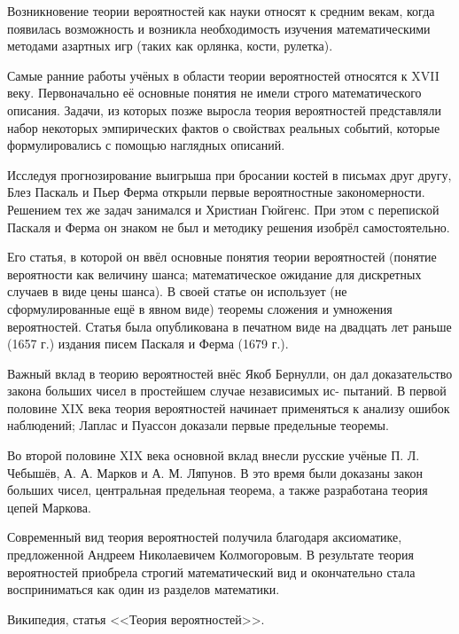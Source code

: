 
Возникновение теории вероятностей как науки относят к средним векам, когда появилась возможность и возникла необходимость изучения математическими методами азартных игр (таких как орлянка, кости, рулетка). 

Самые ранние работы учёных в области теории вероятностей относятся к XVII веку. Первоначально её основные понятия не имели строго математического описания. Задачи, из которых позже выросла теория вероятностей представляли набор некоторых эмпирических фактов о свойствах реальных событий, которые формулировались с помощью наглядных описаний. 

Исследуя прогнозирование выигрыша при бросании костей в письмах друг другу, Блез Паскаль и Пьер Ферма открыли первые вероятностные закономерности. Решением тех же задач занимался и Христиан Гюйгенс. При этом с перепиской Паскаля и Ферма он знаком не был и методику решения изобрёл самостоятельно. 

Его статья, в которой он ввёл основные понятия теории вероятностей (понятие вероятности как величину шанса; математическое ожидание для дискретных случаев в виде цены шанса). В своей статье он использует (не сформулированные ещё в явном виде) теоремы сложения и умножения вероятностей. Статья была опубликована в печатном виде на двадцать лет раньше (1657 г.) издания писем Паскаля и Ферма (1679 г.). 

Важный вклад в теорию вероятностей внёс Якоб Бернулли, он дал доказательство закона больших чисел в простейшем случае независимых ис- пытаний. В первой половине XIX века теория вероятностей начинает применяться к анализу ошибок наблюдений; Лаплас и Пуассон доказали первые предельные теоремы. 

Во второй половине XIX века основной вклад внесли русские учёные П. Л. Чебышёв, А. А. Марков и А. М. Ляпунов. В это время были доказаны закон больших чисел, центральная предельная теорема, а также разработана теория цепей Маркова. 

Современный вид теория вероятностей получила благодаря аксиоматике, предложенной Андреем Николаевичем Колмогоровым. В результате теория вероятностей приобрела строгий математический вид и окончательно стала восприниматься как один из разделов математики.


Википедия, статья <<Теория вероятностей>>.
